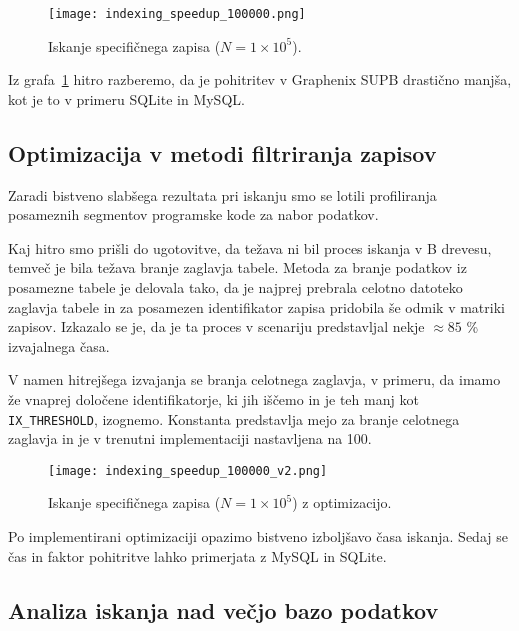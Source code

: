 \documentclass[a4paper,12pt,openright]{book}
\begin{document}
    \begin{figure}[H]
        \centerline{\texttt{[image: indexing\_speedup\_100000.png]}}
        \caption{Iskanje specifičnega zapisa ($N = 1 \times 10^5$).}
        \label{old_speedup}
    \end{figure}

    \noindent
    Iz grafa~\ref{old_speedup} hitro razberemo, da je pohitritev v Graphenix SUPB drastično manjša, kot je to v primeru SQLite in MySQL.

    \subsection{Optimizacija v metodi filtriranja zapisov}

    Zaradi bistveno slabšega rezultata pri iskanju smo se lotili profiliranja posameznih segmentov programske kode za nabor podatkov.

    Kaj hitro smo prišli do ugotovitve, da težava ni bil proces iskanja v B drevesu, temveč je bila težava branje zaglavja tabele. Metoda za branje podatkov iz posamezne tabele je delovala tako, da je najprej prebrala celotno datoteko zaglavja tabele in za posamezen identifikator zapisa pridobila še odmik v matriki zapisov. Izkazalo se je, da je ta proces v scenariju predstavljal nekje $\approx 85$ \% izvajalnega časa.

    V namen hitrejšega izvajanja se branja celotnega zaglavja, v primeru, da imamo že vnaprej določene identifikatorje, ki jih iščemo in je teh manj kot {\tt IX\_THRESHOLD}, izognemo. Konstanta predstavlja mejo za branje celotnega zaglavja in je v trenutni implementaciji nastavljena na \num{100}.
    
    \begin{figure}[H]
        \centerline{\texttt{[image: indexing\_speedup\_100000\_v2.png]}}
        \caption{Iskanje specifičnega zapisa ($N = 1 \times 10^5$) z optimizacijo.}
        \label{idx_speedup}
    \end{figure}

    \noindent
    Po implementirani optimizaciji opazimo bistveno izboljšavo časa iskanja. Sedaj se čas in faktor pohitritve lahko primerjata z MySQL in SQLite.

    \subsection{Analiza iskanja nad večjo bazo podatkov}
\end{document}
